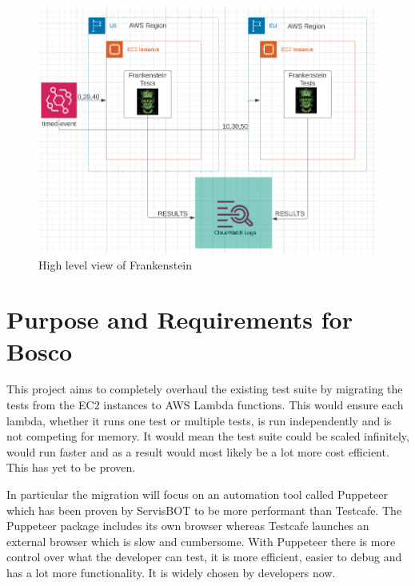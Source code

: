 \documentclass[12pt,a4paper,titlepage]{report}
\begin{document}
  \begin{figure}[ht]
    \centering
    \includegraphics[width=\textwidth,height=\textheight,keepaspectratio]{./diagrams/frank_high_level.png}
    \caption{High level view of Frankenstein}
  \end{figure}
  \clearpage

\section{Purpose and Requirements for Bosco}

This project aims to completely overhaul the existing test suite by migrating the tests from the EC2 instances to AWS Lambda functions. This would ensure each lambda, whether it runs one test or multiple tests, is run independently and is not competing for memory. It would mean the test suite could be scaled infinitely, would run faster and as a result would most likely be a lot more cost efficient. This has yet to be proven.

In particular the migration will focus on an automation tool called Puppeteer which has been proven by ServisBOT to be more performant than Testcafe. The Puppeteer package includes its own browser whereas Testcafe launches an external browser which is slow and cumbersome. With Puppeteer there is more control over what the developer can test, it is more efficient, easier to debug and has a lot more functionality. It is widely chosen by developers now.
\end{document}
